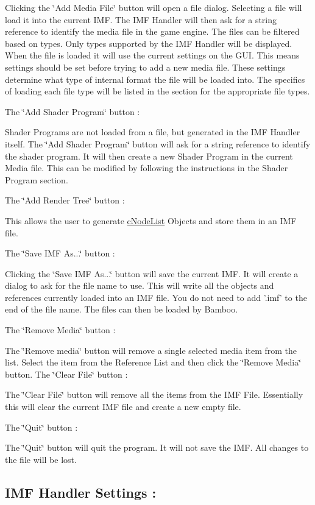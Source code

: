  Clicking the \char`\"{}Add Media File\char`\"{} button will open a file dialog. Selecting a file will load it into the current IMF. The IMF Handler will then ask for a string reference to identify the media file in the game engine. The files can be filtered based on types. Only types supported by the IMF Handler will be displayed. When the file is loaded it will use the current settings on the GUI. This means settings should be set before trying to add a new media file. These settings determine what type of internal format the file will be loaded into. The specifics of loading each file type will be listed in the section for the appropriate file types. \par
 The \char`\"{}Add Shader Program\char`\"{} button :\par
 Shader Programs are not loaded from a file, but generated in the IMF Handler itself. The \char`\"{}Add Shader Program\char`\"{} button will ask for a string reference to identify the shader program. It will then create a new Shader Program in the current Media file. This can be modified by following the instructions in the Shader Program section. \par
 The \char`\"{}Add Render Tree\char`\"{} button :\par
 This allows the user to generate \hyperlink{classc_node_list}{cNodeList} Objects and store them in an IMF file. \par
 The \char`\"{}Save IMF As...\char`\"{} button :\par
 Clicking the \char`\"{}Save IMF As...\char`\"{} button will save the current IMF. It will create a dialog to ask for the file name to use. This will write all the objects and references currently loaded into an IMF file. You do not need to add '.imf' to the end of the file name. The files can then be loaded by Bamboo. \par
 The \char`\"{}Remove Media\char`\"{} button :\par
 The \char`\"{}Remove media\char`\"{} button will remove a single selected media item from the list. Select the item from the Reference List and then click the \char`\"{}Remove Media\char`\"{} button. The \char`\"{}Clear File\char`\"{} button :\par
 The \char`\"{}Clear File\char`\"{} button will remove all the items from the IMF File. Essentially this will clear the current IMF file and create a new empty file. \par
 The \char`\"{}Quit\char`\"{} button :\par
 The \char`\"{}Quit\char`\"{} button will quit the program. It will not save the IMF. All changes to the file will be lost. \hypertarget{_using_engine_page_IMFSettings}{}\subsection{IMF Handler Settings :}\label{_using_engine_page_IMFSettings}
